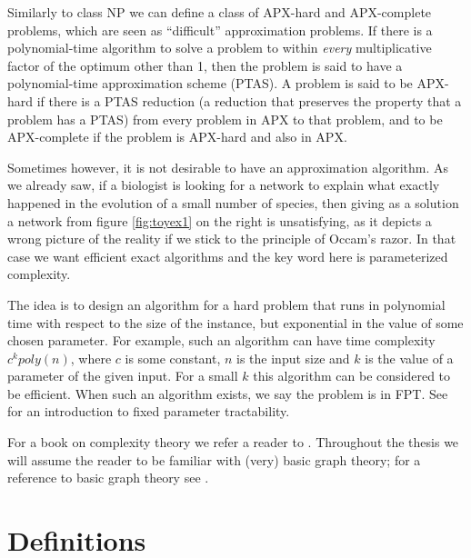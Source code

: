 {{
Similarly to class NP we can define a class of APX-hard and APX-complete problems, which are seen as ``difficult'' approximation problems. If there is a polynomial-time algorithm to solve a problem to within \emph{every} multiplicative factor of the optimum other than 1, then the problem is said to have a polynomial-time approximation scheme (PTAS). A problem is said to be APX-hard if there is a PTAS reduction (a reduction that preserves the property that a problem has a PTAS) from every problem in APX to that problem, and to be APX-complete if the problem is APX-hard and also in APX. 
}



Sometimes however, it is not desirable to have an approximation algorithm. As we already saw, if a biologist is looking for a network to explain what exactly happened in the evolution of a small number of species, then giving as a solution a network from figure \ref{fig:toyex1} on the right is unsatisfying, as it depicts a wrong picture of the reality if we stick to the principle of Occam's razor. In that case we want efficient exact algorithms and the key word here is parameterized complexity. 

The idea is to design an algorithm for a hard problem that runs in polynomial time with respect to the size of the instance, but exponential in the value of some chosen parameter. %
For example, such an algorithm can have time complexity $c^k poly(n)$, where $c$ is some constant, $n$ is the input size and $k$ is the value of a parameter of the given input. For a small $k$ this algorithm can be considered to be efficient. When such an algorithm exists, we say the problem is in FPT. See \cite{downey1999,niedermeier2006} for an introduction to fixed parameter tractability.


For a book on complexity theory we refer a reader to \cite{Arora}. Throughout the thesis we will assume the reader to be familiar with (very) basic graph theory; for a reference to basic graph theory see \cite{diestel2000graph}. 


\section{Definitions}
   
  
}
